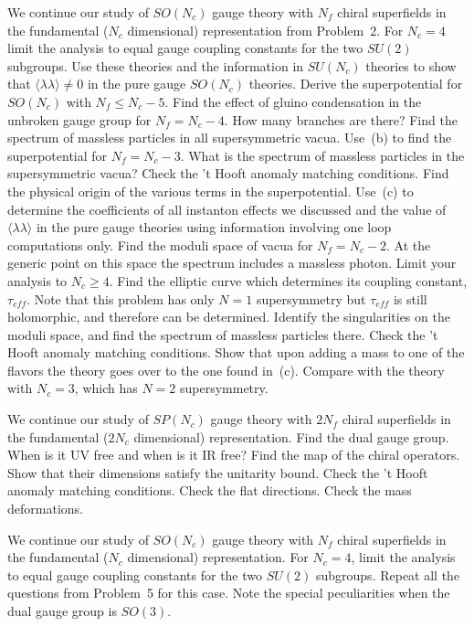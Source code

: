 	\probsec
 We continue our study of $SO(N_c)$ gauge theory with $N_f$ chiral
superfields in the fundamental ($N_c$ dimensional) representation from
Problem~2.  For $N_c=4$ limit the analysis to equal gauge coupling constants
for the two $SU(2)$ subgroups.
 \sec Use these theories and the information in $SU(N_c)$ theories to show
that $\langle \lambda \lambda \rangle \not=0$ in the pure gauge $SO(N_c)$
theories.  Derive the superpotential for $SO(N_c)$ with $N_f \le N_c-5$.
 \sec Find the effect of gluino condensation in the unbroken gauge group for
$N_f=N_c-4$.  How many branches are there?  Find the spectrum of massless
particles in all supersymmetric vacua.
 \sec Use~(b) to find the superpotential for $N_f=N_c-3$.  What is the
spectrum of massless particles in the supersymmetric vacua?  Check the
't Hooft anomaly matching conditions.  Find the physical origin of the various
terms in the superpotential.
 \sec Use~(c) to determine the coefficients of all instanton effects we
discussed and the value of $\langle \lambda \lambda \rangle$ in the pure
gauge theories using information involving one loop computations only.
 \sec Find the moduli space of vacua for $N_f=N_c-2$.  At the generic point
on this space the spectrum includes a massless photon.  Limit your analysis
to $N_c\ge 4$.  Find the elliptic curve which determines its coupling
constant, $\tau_{eff}$.  Note that this problem has only $N=1$ supersymmetry
but $\tau_{eff}$ is still holomorphic, and therefore can be determined.
Identify the singularities on the moduli space, and find the spectrum of
massless particles there.  Check the 't Hooft anomaly matching conditions.
Show that upon adding a mass to one of the flavors the theory goes over to
the one found in~(c).  Compare with the theory with $N_c=3$, which has $N=2$
supersymmetry.
	\endprobsec


	\probsec
 We continue our study of $SP(N_c)$ gauge theory with $2N_f$ chiral
superfields in the fundamental ($2N_c$ dimensional) representation.
 \sec Find the dual gauge group.  When is it UV free and when is it IR
free?
 \sec Find the map of the chiral operators.  Show that their
dimensions satisfy the unitarity bound.
 \sec Check the 't Hooft anomaly matching conditions.
 \sec Check the flat directions.
 \sec Check the mass deformations.
	\endprobsec

	\problem 
 We continue our study of $SO(N_c)$ gauge theory with $N_f$ chiral
superfields in the fundamental ($N_c$ dimensional) representation.  For
$N_c=4$, limit the analysis to equal gauge coupling constants for the two
$SU(2)$ subgroups.  Repeat all the questions from Problem~5 for this case.
Note the special peculiarities when the dual gauge group is $SO(3)$.
	\endproblem

\enddocument
